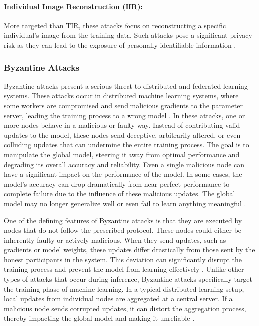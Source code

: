 \documentclass[conference]{IEEEtran}
\begin{document}
\paragraph{Individual Image Reconstruction (IIR):}
More targeted than TIR, these attacks focus on reconstructing a specific individual’s image from the training data. Such attacks pose a significant privacy risk as they can lead to the exposure of personally identifiable information \cite{dibbo2023sok}.
\setcounter{paragraph}{0}




\subsubsection{Byzantine Attacks}
Byzantine attacks present a serious threat to distributed and federated learning systems. These attacks occur in distributed machine learning systems, where some workers are compromised and send malicious gradients to the parameter server, leading the training process to a wrong model \cite{wu2021tolerating}. In these attacks, one or more nodes behave in a malicious or faulty way. Instead of contributing valid updates to the model, these nodes send deceptive, arbitrarily altered, or even colluding updates that can undermine the entire training process. The goal is to manipulate the global model, steering it away from optimal performance and degrading its overall accuracy and reliability. Even a single malicious node can have a significant impact on the performance of the model. In some cases, the model’s accuracy can drop dramatically from near-perfect performance to complete failure due to the influence of these malicious updates. The global model may no longer generalize well or even fail to learn anything meaningful \cite{shi2022challenges}.

One of the defining features of Byzantine attacks is that they are executed by nodes that do not follow the prescribed protocol. These nodes could either be inherently faulty or actively malicious. When they send updates, such as gradients or model weights, these updates differ drastically from those sent by the honest participants in the system. This deviation can significantly disrupt the training process and prevent the model from learning effectively \cite{konstantinidis2023detection}. Unlike other types of attacks that occur during inference, Byzantine attacks specifically target the training phase of machine learning. In a typical distributed learning setup, local updates from individual nodes are aggregated at a central server. If a malicious node sends corrupted updates, it can distort the aggregation process, thereby impacting the global model and making it unreliable \cite{wang2021elite}.
\end{document}
